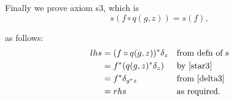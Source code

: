 \documentclass[10pt,a4paper]{scrartcl}
\begin{document}
\noindent
Finally we prove axiom s3, which is
\begin{equation*}
s(f \circ q(g,z))=s(f),
\end{equation*}

\noindent
 as follows:
\begin{align*}
lhs &= (f \circ q(g,z)) ^* \delta_z    && \mbox{from defn of s} \\
  &= f ^* (  q(g,z) ^* \delta_z)     &&\mbox{by \ref{star3}} \\
  &= f ^* \delta_{g ^* z}            && \mbox{from \ref{delta3}} \\
	&= rhs                                 && \mbox{as required.}
\end{align*}



 
\end{document}

